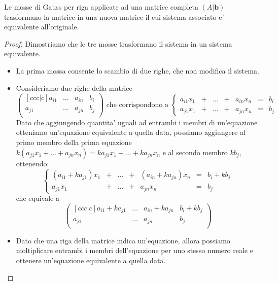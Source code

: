 \begin{proposition}
    Le mosse di Gauss per riga applicate ad una matrice completa $(A|\bm b)$ trasformano la matrice in una nuova matrice il cui sistema associato e' equivalente all'originale.
\end{proposition}
\begin{proof} Dimostriamo che le tre mosse trasformano il sistema in un sistema equivalente.
    \begin{itemize}
        \item La prima mossa consente lo scambio di due righe, che non modifica il sistema.
        \item Consideriamo due righe della matrice \[
            \begin{pmatrix}[ccc|c]
                a_{i1} & \dots & a_{in} & b_i\\
                a_{j1} & \dots & a_{jn} & b_j\\
            \end{pmatrix} 
            \text{ che corrispondono a }
            \left\{
                \begin{array}{rororor }
                a_{i1}x_1 & + & \dots & + & a_{in}x_n & = & b_i \\
                a_{j1}x_1 & + & \dots & + & a_{jn}x_n & = & b_j
                \end{array}
                \right.
        \]
        Dato che aggiungendo quantita' uguali ad entrambi i membri di un'equazione otteniamo un'equazione equivalente a quella data, possiamo aggiungere al primo membro della prima equazione $k(a_{j1}x_1 + \dots + a_{jn}x_n) = ka_{j1}x_1 + \dots + ka_{jn}x_n$ e al secondo membro $kb_j$, ottenendo: \[
            \left\{
                \begin{array}{rororor }
                (a_{i1} + ka_{j1})x_1 & + & \dots & + & (a_{in} + ka_{jn})x_n & = & b_i + kb_j \\
                a_{j1}x_1 & + & \dots & + & a_{jn}x_n & = & b_j
                \end{array}
                \right.
        \] che equivale a \[
        \begin{pmatrix}[ccc|c]
            a_{i1} + ka_{j1}    & \dots & a_{in} + ka_{jn}  & b_i + kb_j\\
            a_{j1}              & \dots & a_{jn}            & b_j\\
        \end{pmatrix} 
        \]
        \item Dato che una riga della matrice indica un'equazione, allora possiamo moltiplicare entrambi i membri dell'equazione per uno stesso numero reale e ottenere un'equazione equivalente a quella data.
    \end{itemize}
\end{proof}


